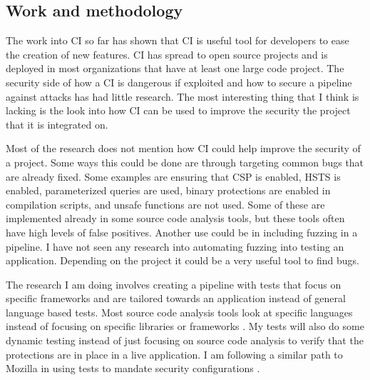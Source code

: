 \subsection{Work and methodology}
	The work into CI so far has shown that CI is useful tool for developers to ease the creation of new features. CI has spread to open source projects and is deployed in most organizations that have 
    at least one large code project. The security side of how a CI is dangerous if exploited and how to secure a pipeline against attacks has had little research. The most interesting thing that I 
    think is lacking is the look into how CI can be used to improve the security the project that it is integrated on.
	
	Most of the research does not mention how CI could help improve the security of a project. Some ways this could be done are through targeting common bugs that are already fixed. Some examples
    are ensuring that CSP is enabled, HSTS is enabled, parameterized queries are used, binary protections are enabled in compilation scripts, and unsafe functions are not used. Some of these are
    implemented already in some source code analysis tools, but these tools often have high levels of false positives. Another use could be in including fuzzing in a pipeline. I have not seen any
    research into automating fuzzing into testing an application. Depending on the project it could be a very useful tool to find bugs.

    The research I am doing involves creating a pipeline with tests that focus on specific frameworks and are tailored towards an application instead of general language based tests. Most source
    code analysis tools look at specific languages instead of focusing on specific libraries or frameworks \cite{bandit, findbugs, findsecbugs}. My tests will also do some dynamic testing
    instead of just focusing on source code analysis to verify that the protections are in place in a live application. I am following a similar path to Mozilla in using tests to mandate security
    configurations \cite{Vehent}.
